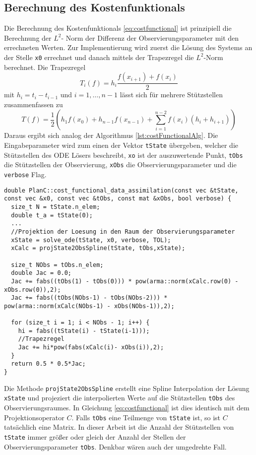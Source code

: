 \subsection{Berechnung des Kostenfunktionals}
Die Berechnung des Kostenfunktionals \eqref{eq:costfunctional} ist prinzipiell die Berechnung der $L^2$- Norm der Differenz der Observierungsparameter mit den errechneten Werten. Zur Implementierung wird zuerst die Lösung des Systems an der Stelle \texttt{x0} errechnet und danach mittels der Trapezregel die $L^2$-Norm berechnet. Die Trapezregel 
\[
 T_i(f) = h_i \frac{f(x_{i+1})+f(x_i)}{2}
\]
mit $h_i = t_{i}-t_{i-1}$ und $i=1,\ldots,n-1$ lässt sich für mehrere Stützstellen zusammenfassen zu
\[
 T(f) =\frac{1}{2} \left(h_1 f(x_0) + h_{n-1} f(x_{n-1}) + \sum_{i=1}^{n-2} f(x_i)(h_i+h_{i+1})\right)
\]
Daraus ergibt sich analog der Algorithmus \ref{lst:costFunctionalAlg}. Die Eingabeparameter wird zum einen der Vektor \texttt{tState} übergeben, welcher die Stützstellen des ODE Lösers beschreibt, \texttt{xo} ist der auszuwertende Punkt, \texttt{tObs} die Stützstellen der Observierung, \texttt{xObs} die Observierungsparameter und die \texttt{verbose} Flag.
\begin{lstlisting}[caption=Berechnung des Kostenfunktionals,label=lst:costFunctionalAlg]
double PlanC::cost_functional_data_assimilation(const vec &tState, const vec &x0, const vec &tObs, const mat &xObs, bool verbose) {
  size_t N = tState.n_elem;
  double t_a = tState(0);
  ...
  //Projektion der Loesung in den Raum der Observierungsparameter
  xState = solve_ode(tState, x0, verbose, TOL);
  xCalc = projState2ObsSpline(tState, tObs,xState);
  
  size_t NObs = tObs.n_elem;
  double Jac = 0.0;
  Jac += fabs((tObs(1) - tObs(0))) * pow(arma::norm(xCalc.row(0) - xObs.row(0)),2);
  Jac += fabs((tObs(NObs-1) - tObs(NObs-2))) * pow(arma::norm(xCalc(NObs-1) - xObs(NObs-1)),2);

  for (size_t i = 1; i < NObs - 1; i++) {
    hi = fabs((tState(i) - tState(i-1)));
    //Trapezregel
    Jac += hi*pow(fabs(xCalc(i)- xObs(i)),2);
  }
  return 0.5 * 0.5*Jac;
}
\end{lstlisting}
Die Methode \texttt{projState2ObsSpline} erstellt eine Spline Interpolation der Lösung \texttt{xState} und projeziert die interpolierten Werte auf die Stützstellen \texttt{tObs} des Observierungsraumes. In Gleichung \eqref{eq:costfunctional} ist dies identisch mit dem Projektionsoperator $C$. Falls \texttt{tObs} eine Teilmenge von \texttt{tState} ist, so ist $C$ tatsächlich eine Matrix. In dieser Arbeit ist die Anzahl der Stützstellen von \texttt{tState} immer größer oder gleich der Anzahl der Stellen der Observierungsparameter \texttt{tObs}. Denkbar wären auch der umgedrehte Fall.

